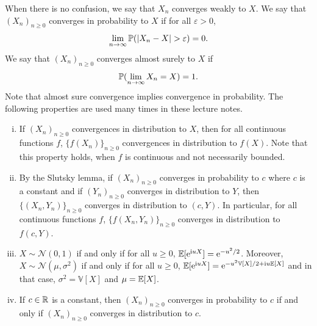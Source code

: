 \documentclass[english,graybox,envcountchap,envcountsame,sectrefs,shortlabels]{svmono}
\theoremstyle{style}
\newcommand{\rme}{\mathrm{e}}
\newcommand{\rmi}{\mathrm{i}}
\newcommand{\gauss}{\mathcal{N}}
\newcommand{\eqsp}{}
\begin{document}
When there is no confusion, we say that $X_n$ converges weakly to $X$. We say that $(X_n)_{n\geq 0}$ converges in probability to $X$ if for all $\varepsilon>0$,
$$
\lim_{n \to \infty} \PP(|X_n -X|>\varepsilon)=0\eqsp.
$$
 We say that $(X_n)_{n\geq 0}$ converges almost surely to $X$ if
$$
\PP(\lim_{n \to \infty}X_n=X)=1\eqsp.
$$
Note that almost sure convergence implies convergence in probability.
\newcommand{\var}{\mathrm{var}}
The following properties are used many times in these lecture notes.
\begin{enumerate}[(i)]
\item If $(X_n)_{n\geq 0}$ convergences in distribution to $X$, then for all continuous functions $f$, $\{f(X_n)\}_{n\geq 0}$ convergences in distribution to $f(X)$. Note that this property  holds, when $f$ is continuous and not necessarily bounded.
\item By the Slutsky lemma, if $(X_n)_{n\geq 0}$ converges in probability to $c$ where $c$ is a constant and if $(Y_n)_{n\geq 0}$ converges in distribution to $Y$, then $\{(X_n,Y_n)\}_{n\geq 0}$ converges in distribution to $(c,Y)$. In particular, for all continuous functions $f$, $\{f(X_n,Y_n)\}_{n\geq 0}$ converges in distribution to $f(c,Y)$.
\item $X \sim \gauss(0,1)$ if and only if for all $u \geq 0$, $\PE[\rme^{\rmi u
    X}]=\rme^{-u^2/2}$. Moreover, $X \sim \gauss(\mu,\sigma^2)$ if and only if
  for all $u \geq 0$, $\PE[\rme^{\rmi u X}]=\rme^{-u^2 \mathbb{V}[X]/2+\rmi
    u \PE[X]}$ and in that case, $\sigma^2=\mathbb{V}[X]$ and $\mu=\mathbb{E}[X]$.
 \item If $c\in\mathbb{R}$ is a constant, then $(X_n)_{n\geq 0}$ converges in probability to $c$ if and only if $(X_n)_{n\geq 0}$ converges in distribution to $c$.
\end{enumerate}



\dominitoc
\tableofcontents
\end{document}
